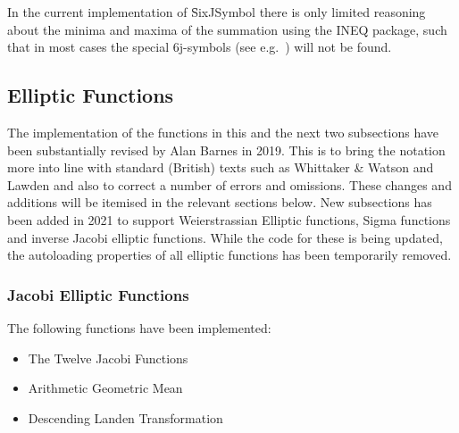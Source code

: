 In the current implementation of \f{SixJSymbol} there is only limited
reasoning about the minima and maxima of the summation using
the INEQ package, such that in most
cases the special 6j-symbols (see e.g.\ \cite{LandoltBoernstein:68})
will not be found.

\subsection{Elliptic Functions}
The implementation of the functions in this and the next two subsections have
been substantially revised by Alan Barnes in 2019. This is to bring the
notation more into line with standard (British) texts such as Whittaker
\& Watson \cite{WhittakerWatson:69} and Lawden \cite{Lawden:89} and also to correct
a number of errors and omissions. These changes and additions will be itemised in the relevant
sections below.  New subsections has been added in 2021 to support  Weierstrassian Elliptic
functions, Sigma functions and inverse Jacobi elliptic functions.
While the code for these is being updated, the autoloading
properties of all elliptic functions has been temporarily removed.


\hypertarget{JACEF}{}
\subsubsection{Jacobi Elliptic  Functions}
The following functions have been implemented:
\begin{itemize}
\item The Twelve Jacobi Functions
\item Arithmetic Geometric Mean
\item Descending Landen Transformation
\end{itemize}

